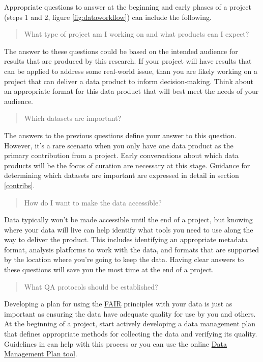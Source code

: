 \documentclass[
]{book}
\begin{document}
Appropriate questions to answer at the beginning and early phases of a project (steps 1 and 2, figure \ref{fig:dataworkflow}) can include the following.

\begin{quote}
What type of project am I working on and what products can I expect?
\end{quote}

The answer to these questions could be based on the intended audience for results that are produced by this research. If your project will have results that can be applied to address some real-world issue, than you are likely working on a project that can deliver a data product to inform decision-making. Think about an appropriate format for this data product that will best meet the needs of your audience.

\begin{quote}
Which datasets are important?
\end{quote}

The answers to the previous questions define your answer to this question. However, it's a rare scenario when you only have one data product as the primary contribution from a project. Early conversations about which data products will be the focus of curation are necessary at this stage. Guidance for determining which datasets are important are expressed in detail in section \ref{contribs}.

\begin{quote}
How do I want to make the data accessible?
\end{quote}

Data typically won't be made accessible until the end of a project, but knowing where your data will live can help identify what tools you need to use along the way to deliver the product. This includes identifying an appropriate metadata format, analysis platforms to work with the data, and formats that are supported by the location where you're going to keep the data. Having clear answers to these questions will save you the most time at the end of a project.

\begin{quote}
What QA protocols should be established?
\end{quote}

Developing a plan for using the \protect\hyperlink{fair}{FAIR} principles with your data is just as important as ensuring the data have adequate quality for use by you and others. At the beginning of a project, start actively developing a data management plan that defines appropriate methods for collecting the data and verifying its quality. Guidelines in \citet{Michener15} can help with this process or you can use the online \href{https://dmptool.org/}{Data Management Plan tool}.
\end{document}
